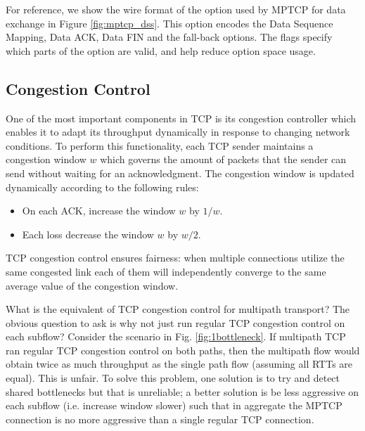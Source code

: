 For reference, we show the wire format of the option used by MPTCP for data exchange in Figure 
\ref{fig:mptcp_dss}. This option encodes the Data Sequence Mapping, Data ACK, Data FIN and 
the fall-back options. The flags specify which parts of the option are valid, and help reduce option
space usage. 

\subsection{Congestion Control}

One of the most important components in TCP is its congestion controller which 
enables it to adapt its throughput dynamically in response to changing network 
conditions. To perform this functionality, each TCP sender maintains a congestion 
window $w$ which governs the amount of packets that the sender can send without 
waiting for an acknowledgment. The congestion window is updated dynamically 
according to the following rules:

\begin{itemize}
\item On each ACK, increase the window $w$ by $1/w$.
\item Each loss decrease the window $w$ by $w/2$.
\end{itemize}

TCP congestion control ensures fairness:  when multiple connections 
utilize the same congested link each of them will independently converge to the 
same average value of the congestion window.  

What is the equivalent of TCP congestion control for multipath
transport? The obvious question to ask is why not just run regular TCP congestion
control on each subflow?
Consider the scenario in Fig. \ref{fig:1bottleneck}. If multipath
TCP ran regular TCP congestion control on both paths, then the
multipath flow would obtain twice as much throughput as the single
path flow (assuming all RTTs are equal). This is unfair. To solve
this problem, one solution is to try and detect shared bottlenecks
but that is unreliable; a better solution is be less aggressive on
each subflow (i.e. increase window slower) such that in aggregate the MPTCP connection 
is no more aggressive than a single regular TCP connection. 


